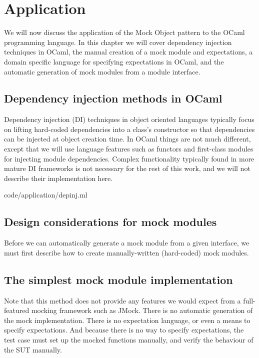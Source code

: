 \chapter{Application}
\label{application}

We will now discuss the application of the Mock Object pattern to the
OCaml programming language. In this chapter we will cover dependency
injection techniques in OCaml, the manual creation of a mock module
and expectations, a domain specific language for specifying
expectations in OCaml, and the automatic generation of mock modules
from a module interface.

\section{Dependency injection methods in OCaml}
\label{application:di}

Dependency injection (DI) techniques in object oriented languages
typically focus on lifting hard-coded dependencies into a class's
constructor so that dependencies can be injected at object creation
time. In OCaml things are not much different, except that we will use
language features such as functors and first-class modules for
injecting module dependencies. Complex functionality typically found
in more mature DI frameworks is not necessary for the rest of this
work, and we will not describe their implementation here.

 {code/application/depinj.ml}

\section{Design considerations for mock modules}
\label{application:manual-mock}

Before we can automatically generate a mock module from a given
interface, we must first describe how to create manually-written
(hard-coded) mock modules.

\section{The simplest mock module implementation}
\label{application:simple}


Note that this method does not provide any features we would expect
from a full-featured mocking framework such as JMock. There is no
automatic generation of the mock implementation. There is no
expectation language, or even a means to specify expectations. And
because there is no way to specify expectations, the test case must
set up the mocked functions manually, and verify the behaviour of the
SUT manually.

